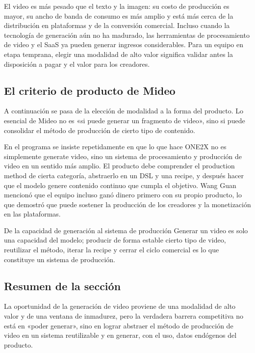 El video es más pesado que el texto y la imagen: su costo de producción es mayor, su ancho de banda de consumo es más amplio y está más cerca de la distribución en plataformas y de la conversión comercial. Incluso cuando la tecnología de generación aún no ha madurado, las herramientas de procesamiento de video y el SaaS ya pueden generar ingresos considerables. Para un equipo en etapa temprana, elegir una modalidad de alto valor significa validar antes la disposición a pagar y el valor para los creadores.

\subsection{El criterio de producto de Mideo}

A continuación se pasa de la elección de modalidad a la forma del producto. Lo esencial de Mideo no es «si puede generar un fragmento de video», sino si puede consolidar el método de producción de cierto tipo de contenido.

En el programa se insiste repetidamente en que lo que hace ONE2X no es simplemente generate video, sino un sistema de procesamiento y producción de video en un sentido más amplio. El producto debe comprender el production method de cierta categoría, abstraerlo en un DSL y una recipe, y después hacer que el modelo genere contenido continuo que cumpla el objetivo. Wang Guan mencionó que el equipo incluso ganó dinero primero con su propio producto, lo que demostró que puede sostener la producción de los creadores y la monetización en las plataformas.

\begin{importantbox}{De la capacidad de generación al sistema de producción}
Generar un video es solo una capacidad del modelo; producir de forma estable cierto tipo de video, reutilizar el método, iterar la recipe y cerrar el ciclo comercial es lo que constituye un sistema de producción.
\end{importantbox}

\subsection{Resumen de la sección}

La oportunidad de la generación de video proviene de una modalidad de alto valor y de una ventana de inmadurez, pero la verdadera barrera competitiva no está en «poder generar», sino en lograr abstraer el método de producción de video en un sistema reutilizable y en generar, con el uso, datos endógenos del producto.
